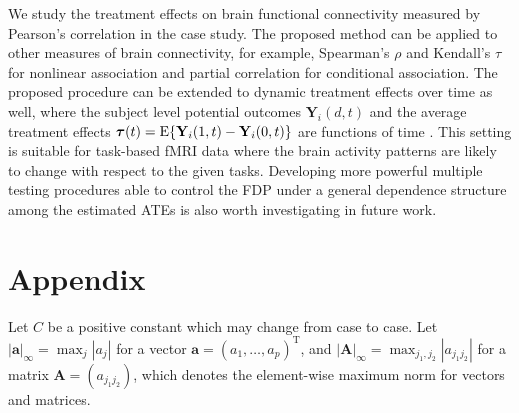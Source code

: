 \documentclass[12pt]{article}
\def\T{{ \mathrm{\scriptscriptstyle T} }}
\theoremstyle{definition}
\newcommand{\E}{\rm E}
\newcommand{\bA}{{\mathbf A}}
\newcommand{\bY}{{\mathbf Y}}
\newcommand{\ba}{{\mathbf a}}
\newcommand{\btau}{\boldsymbol{\tau}}
\begin{document}
We study the treatment effects on brain functional connectivity measured by Pearson’s correlation in the case study. 
The proposed method can be applied to other measures of brain connectivity, for example, Spearman’s $\rho$ and Kendall’s $\tau$ for nonlinear association and partial correlation for conditional association. 
The proposed procedure can be extended to dynamic treatment effects over time as well, where the subject level potential outcomes $\bY_i(d, t)$ and the average treatment effects $\btau(t) = {\E}\{\bY_{i}(1, t) - \bY_{i}(0, t)\}$ are functions of time \citep{bojinov2021panel}.
This setting is suitable for task-based fMRI data where the brain activity patterns are likely to change with respect to the given tasks. 
Developing more powerful multiple testing procedures able to control the FDP under a general dependence structure among the estimated ATEs is also worth investigating in future work.

\iffalse

\section{Appendix}

Let $C$ be a positive constant which may change from case to case. Let $|\ba|_{\infty} = \max_{j} |a_j|$ for a vector $\ba = (a_1, \ldots, a_p)^{\T}$, and $|\bA|_{\infty} = \max_{j_1, j_2} |a_{j_1j_2}|$ for a matrix $\bA = (a_{j_1j_2})$, which denotes 
the element-wise maximum norm for vectors and matrices. 
\end{document}
